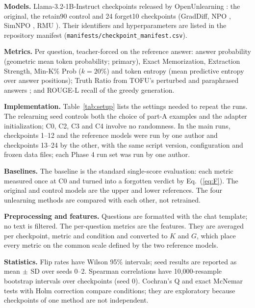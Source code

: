 \documentclass[conference]{IEEEtran}
\begin{document}
\textbf{Models.} Llama-3.2-1B-Instruct \cite{grattafiori2024llama3} checkpoints released by OpenUnlearning \cite{dorna2025openunlearning}: the original, the retain90 control and 24 forget10 checkpoints (GradDiff, NPO \cite{zhang2024npo}, SimNPO \cite{fan2025simnpo}, RMU \cite{li2024wmdp}). Their identifiers and hyperparameters are listed in the repository manifest (\texttt{manifests/checkpoint\_manifest.csv}).

\textbf{Metrics.} Per question, teacher-forced on the reference answer: answer probability (geometric mean token probability; primary), Exact Memorization, Extraction Strength, Min-K\% Prob ($k=20\%$) \cite{shi2024mink} and token entropy (mean predictive entropy over answer positions); Truth Ratio from TOFU's perturbed and paraphrased answers \cite{maini2024tofu}; and ROUGE-L recall \cite{lin2004rouge} of the greedy generation.

\textbf{Implementation.} Table~\ref{tab:setup} lists the settings needed to repeat the runs. The relearning seed controls both the choice of part-A examples and the adapter initialization; C0, C2, C3 and C4 involve no randomness. In the main runs, checkpoints 1--12 and the reference models were run by one author and checkpoints 13--24 by the other, with the same script version, configuration and frozen data files; each Phase 4 run set was run by one author.

\textbf{Baselines.} The baseline is the standard single-score evaluation: each metric measured once at C0 and turned into a forgotten verdict by Eq.~(\ref{eq:F}). The original and control models are the upper and lower references. The four unlearning methods are compared with each other, not retrained.

\textbf{Preprocessing and features.} Questions are formatted with the chat template; no text is filtered. The per-question metrics are the features. They are averaged per checkpoint, metric and condition and converted to $K$ and $G$, which place every metric on the common scale defined by the two reference models.

\textbf{Statistics.} Flip rates have Wilson 95\% intervals; seed results are reported as mean$\,\pm\,$SD over seeds 0--2. Spearman correlations have 10,000-resample bootstrap intervals over checkpoints (seed 0). Cochran's Q and exact McNemar tests with Holm correction compare conditions; they are exploratory because checkpoints of one method are not independent.
\end{document}
